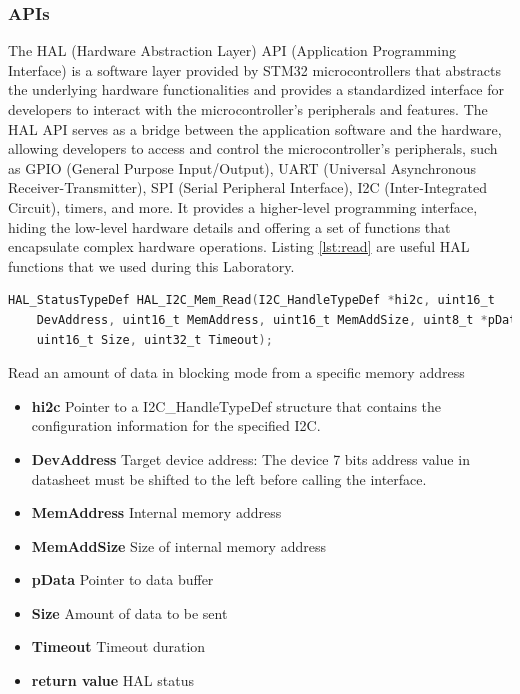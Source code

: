 \documentclass[english]{article}
\begin{document}
\subsubsection{APIs}
The HAL (Hardware Abstraction Layer) API (Application Programming Interface) 
is a software layer provided by STM32 microcontrollers that abstracts
 the underlying hardware functionalities and provides a standardized 
 interface for developers to interact with the microcontroller's peripherals and features.
The HAL API serves as a bridge between the application software and the hardware, 
allowing developers to access and control the microcontroller's peripherals,
such as GPIO (General Purpose Input/Output), UART (Universal Asynchronous Receiver-Transmitter),
SPI (Serial Peripheral Interface), I2C (Inter-Integrated Circuit), 
timers, and more. It provides a higher-level programming interface,
hiding the low-level hardware details and offering a set of functions that
encapsulate complex hardware operations. \newline
Listing \ref{lst:read} are useful HAL functions that we used during this Laboratory.
\begin{lstlisting}[language=C, caption={Reading Register values}, label={lst:read} ]
HAL_StatusTypeDef HAL_I2C_Mem_Read(I2C_HandleTypeDef *hi2c, uint16_t
    DevAddress, uint16_t MemAddress, uint16_t MemAddSize, uint8_t *pData,
    uint16_t Size, uint32_t Timeout);
\end{lstlisting}
Read an amount of data in blocking mode from a specific memory address  
\begin{itemize}
    \item \textbf{hi2c} Pointer to a I2C\_HandleTypeDef structure that contains the configuration information
    for the specified I2C.
    \item \textbf{DevAddress} Target device address: The device 7 bits address value in datasheet must be
    shifted to the left before calling the interface.
    \item \textbf{MemAddress} Internal memory address
    \item \textbf{MemAddSize} Size of internal memory address
    \item \textbf{pData} Pointer to data buffer
    \item \textbf{Size} Amount of data to be sent
    \item \textbf{Timeout} Timeout duration
    \item \textbf{return value} HAL status
\end{itemize}
\end{document}
